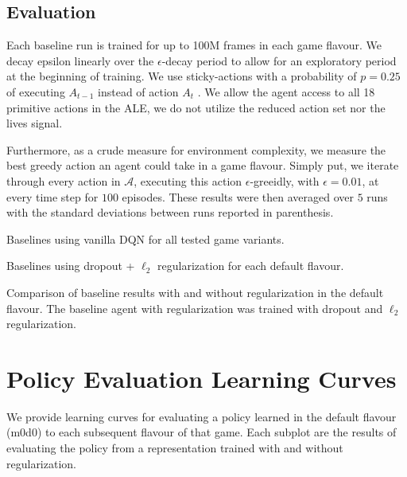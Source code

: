 \documentclass{article}
\begin{document}
\subsection*{Evaluation}
Each baseline run is trained for up to 100M frames in each game flavour. We decay epsilon linearly over the $\epsilon$-decay period to allow for an exploratory period at the beginning of training. We use sticky-actions with a probability of $p=0.25$ of executing $A_{t-1}$ instead of action $A_t$ \citep{Machado18}. We allow the agent access to all 18 primitive actions in the ALE, we do not utilize the reduced action set nor the lives signal.

Furthermore, as a crude measure for environment complexity, we measure the best greedy action an agent could take in a game flavour. Simply put, we iterate through every action in $\mathscr{A}$, executing this action $\epsilon$-greeidly, with $\epsilon = 0.01$, at every time step for $100$ episodes. These results were then averaged over $5$ runs with the standard deviations between runs reported in parenthesis. 

\begin{table}[H]
    \centering
    \resizebox{\textwidth}{!}{
        
    }
    \vspace{3mm}
    \caption{Baselines using vanilla DQN for all tested game variants.}
    \label{table:baselines}
\end{table}
\begin{table}[H]
    \centering
    \resizebox{\textwidth}{!}{
        
    }
    \vspace{3mm}
    \caption{Baselines using dropout + $\ell_2$ regularization for each default flavour.}
    \label{table:baselinesreg}
\end{table}
\begin{table}[H]
    \centering
    \resizebox{\textwidth}{!}{
        
    }
    \vspace{3mm}
    \caption{Comparison of baseline results with and without regularization in the default flavour. The baseline agent with regularization was trained with dropout and $\ell_2$ regularization.}
    \label{table:baselinecompare}
\end{table}


\newpage
\section{Policy Evaluation Learning Curves}
\label{appendix:policy_transfer_cuves}
We provide learning curves for evaluating a policy learned in the default flavour (m0d0) to each subsequent flavour of that game.
Each subplot are the results of evaluating the policy from a representation trained with and without regularization.
\end{document}
